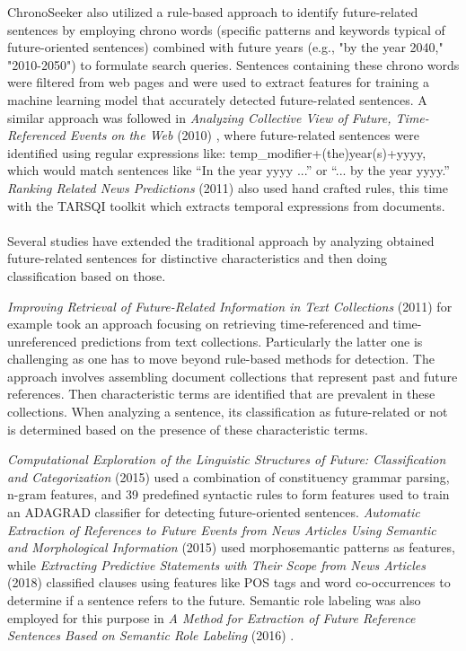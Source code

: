 \documentclass[12pt,oneside,bibtotoc,liststotoc]{scrbook}
\begin{document}
ChronoSeeker \cite{KawaiChronoseeker} also utilized a rule-based approach to identify future-related sentences by employing chrono words (specific patterns and keywords typical of future-oriented sentences) combined with future years (e.g., "by the year 2040," "2010-2050") to formulate search queries. Sentences containing these chrono words were filtered from web pages and were used to extract features for training a machine learning model that accurately detected future-related sentences.
A similar approach was followed in \textit{Analyzing Collective View of Future, Time-Referenced Events on the Web} (2010) \cite{JatowtAnalyzingCollective}, where future-related sentences were identified using regular expressions like: temp\_modifier+(the)year(s)+yyyy, which would match sentences like “In the year yyyy ...” or “... by the year yyyy.”
\textit{Ranking Related News Predictions} (2011) \cite{KanhabuaRanking} also used hand crafted rules, this time with the TARSQI toolkit which extracts temporal expressions from documents.
\\\\
Several studies have extended the traditional approach by analyzing obtained future-related sentences for distinctive characteristics and then doing classification based on those.

\textit{Improving Retrieval of Future-Related Information in Text Collections} (2011) \cite{KanazawaImproving} for example took an approach focusing on retrieving time-referenced and time-unreferenced predictions from text collections. Particularly the latter one is challenging as one has to move beyond rule-based methods for detection. The approach involves assembling document collections that represent past and future references. Then characteristic terms are identified that are prevalent in these collections. When analyzing a sentence, its classification as future-related or not is determined based on the presence of these characteristic terms.

\textit{Computational Exploration of the Linguistic Structures of Future: Classification and Categorization} (2015) \cite{NiComputationalExploration} used a combination of constituency grammar parsing, n-gram features, and 39 predefined syntactic rules to form features used to train an ADAGRAD classifier for detecting future-oriented sentences. \textit{Automatic Extraction of References to Future Events from News Articles Using Semantic and Morphological Information} (2015) \cite{NakajimaAutomaticExtraction} used morphosemantic patterns as features, while \textit{Extracting Predictive Statements with Their Scope from News Articles} (2018) \cite{YarrabellyExtractingPredictive} classified clauses using features like POS tags and word co-occurrences to determine if a sentence refers to the future. Semantic role labeling was also employed for this purpose in \textit{A Method for Extraction of Future Reference Sentences Based on Semantic Role  Labeling} (2016) \cite{NakajimaMethod}. \\
\end{document}
